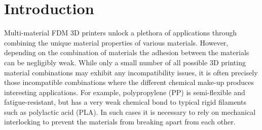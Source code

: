\section{Introduction}
Multi-material FDM 3D printers unlock a plethora of applications through combining the unique material properties of various materials.
However, depending on the combination of materials the adhesion between the materials can be negligibly weak.
While only a small number of all possible 3D printing material combinations may exhibit any incompatibility issues,
it is often precisely those incompatible combinations where the different chemical make-up produces interesting applications.
For example, polypropylene (PP) is semi-flexible and fatigue-resistant, but has a very weak chemical bond to typical rigid filaments such as polylactic acid (PLA).
In such cases it is necessary to rely on mechanical interlocking to prevent the materials from breaking apart from each other.



